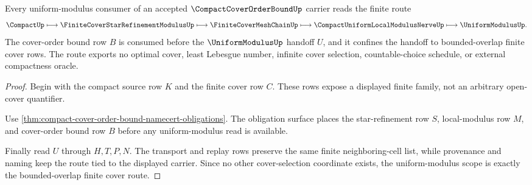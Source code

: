 \begin{theorem}
\label{thm:compact-cover-order-bound-uniform-modulus-scope}
Every uniform-modulus consumer of an accepted $\CompactCoverOrderBoundUp$ carrier reads the finite route
$$
\CompactUp \longmapsto \FiniteCoverStarRefinementModulusUp \longmapsto \FiniteCoverMeshChainUp \longmapsto \CompactUniformLocalModulusNerveUp \longmapsto \UniformModulusUp .
$$
The cover-order bound row $B$ is consumed before the $\UniformModulusUp$ handoff $U$, and it confines the handoff to bounded-overlap finite cover rows. The route exports no optimal cover, least Lebesgue number, infinite cover selection, countable-choice schedule, or external compactness oracle.
\end{theorem}
\begin{proof}
Begin with the compact source row $K$ and the finite cover row $C$. These rows expose a displayed finite family, not an arbitrary open-cover quantifier.

Use \autoref{thm:compact-cover-order-bound-namecert-obligations}. The obligation surface places the star-refinement row $S$, local-modulus row $M$, and cover-order bound row $B$ before any uniform-modulus read is available.

Finally read $U$ through $H,T,P,N$. The transport and replay rows preserve the same finite neighboring-cell list, while provenance and naming keep the route tied to the displayed carrier. Since no other cover-selection coordinate exists, the uniform-modulus scope is exactly the bounded-overlap finite cover route.
\end{proof}




